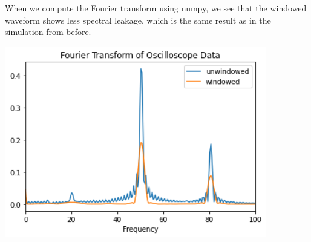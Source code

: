 \documentclass{article}
\begin{document}
    When we compute the Fourier transform using numpy, we see that the windowed waveform shows less spectral leakage, which is the same result as in the simulation from before.
    \begin{mdframed}[backgroundcolor=gray!20, align = center, userdefinedwidth = 4.8in]
    \includegraphics[width = 4.5in]{img/oscilloscopeTransform.png}
    \end{mdframed}
\end{document}
